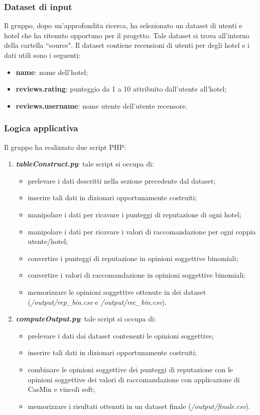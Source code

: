 \documentclass{report}
\begin{document}
		\subsubsection{Dataset di input}
		Il gruppo, dopo un'approfondita ricerca, ha selezionato un dataset di utenti e hotel che ha ritenuto opportuno per il progetto. 
		Tale dataset si trova all'interno della cartella ``source". Il dataset contiene recensioni di utenti per degli hotel e i dati utili
		sono i seguenti:
		\begin{itemize}
			\item \textbf{name}: nome dell'hotel;
			\item \textbf{reviews.rating}: punteggio da 1 a 10 attribuito dall'utente all'hotel;
			\item \textbf{reviews.username}: nome utente dell'utente recensore.
		\end{itemize}
		
		\subsubsection{Logica applicativa}
		Il gruppo ha realizzato due script PHP:
		\begin{enumerate}
			\item \textbf{\textit{tableConstruct.py}}: tale script si occupa di:
				\begin{itemize}
					\item prelevare i dati descritti nella sezione precedente dal dataset;
					\item inserire tali dati in dizionari opportunamente costruiti;
					\item manipolare i dati per ricavare i punteggi di reputazione di ogni hotel;
					\item manipolare i dati per ricavare i valori di raccomandazione per ogni coppia utente/hotel;
					\item convertire i punteggi di reputazione in opinioni soggettive binomiali;
					\item convertire i valori di raccomandazione in opinioni soggettive binomiali;
					\item memorizzare le opinioni soggettive ottenute in dei dataset (\textit{/output/rep\_bin.csv} e 
					\textit{/output/rec\_bin.csv}).
				\end{itemize}				 
			\item \textbf{\textit{computeOutput.py}}: tale script si occupa di:
				\begin{itemize}
					\item prelevare i dati dai dataset contenenti le opinioni soggettive;
					\item inserire tali dati in dizionari opportunamente costruiti;
					\item combinare le opinioni soggettive dei punteggi di reputazione con le opinioni soggettive dei valori di
					raccomandazione con applicazione di CasMin e vincoli soft;
					\item memorizzare i risultati ottenuti in un dataset finale (\textit{/output/finale.csv}). 
				\end{itemize}
		\end{enumerate}
		
\end{document}
